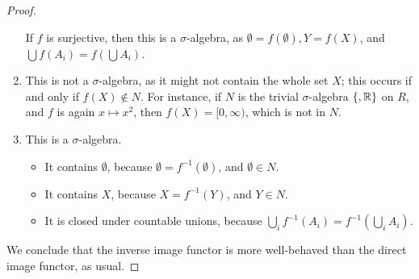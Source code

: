 \documentclass[12pt]{article}
\newcommand{\R}{\mathbb{R}}
\theoremstyle{definition}
\newenvironment{problem}[2][Problem]{\begin{trivlist}
\item[\hskip \labelsep {\bfseries #1}\hskip \labelsep {\bfseries #2.}]}{\end{trivlist}}
\begin{document}
\begin{problem}{5}
\begin{proof}
\begin{enumerate}[label=\alph*)]
			    \par If $f$ is surjective, then this is a $\sigma$-algebra, as $\emptyset = f(\emptyset), Y = f(X)$, and $\bigcup f(A_i) = f\left( \bigcup A_i \right)$.
		    \item This is not a $\sigma$-algebra, as it might not contain the whole set $X$; this occurs if and only if $f(X) \notin N$. For instance, if $N$ is the trivial $\sigma$-algebra $\left\{ \empty, \R \right\}$ on $R$, and $f$ is again $x \mapsto x^2$, then $f(X) = [0, \infty)$, which is not in $N$.
		    \item This is a $\sigma$-algebra. \begin{itemize}
		    \item It contains $\emptyset$, because $\emptyset = f^{-1}(\emptyset)$, and $\emptyset \in N$.
		    \item It contains $X$, because $X = f^{-1}(Y)$, and $Y \in N$.
		    \item It is closed under countable unions, because $\bigcup_i f^{-1}(A_i) = f^{-1}\left( \bigcup_i A_i \right)$. \end{itemize}
		    
\end{enumerate}
\par We conclude that the inverse image functor is more well-behaved than the direct image functor, as usual.
\end{proof}
\end{problem}
\begin{thebibliography}{}
\end{thebibliography}
\end{document}
